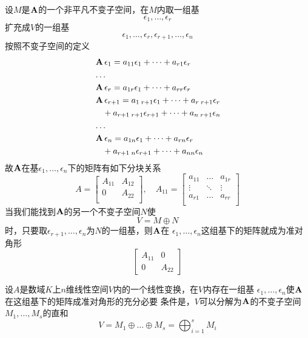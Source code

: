 \documentclass[11pt]{article}
\begin{document}
设\(M\)是\(\operatorname{\textbf{A}}\)的一个非平凡不变子空间，在\(M\)内取一组基
\begin{equation*}
\epsilon_1,\dots,\epsilon_r
\end{equation*}
扩充成\(V\)的一组基
\begin{equation*}
\epsilon_1,\dots,\epsilon_r,\epsilon_{r+1},\dots,\epsilon_n
\end{equation*}
按照不变子空间的定义
\begin{align*}
&\operatorname{\textbf{A}}\epsilon_1=a_{11}\epsilon_1+\dots+a_{r1}\epsilon_r\\
&\dots\\
&\operatorname{\textbf{A}}\epsilon_r=a_{1r}\epsilon_1+\dots+a_{rr}\epsilon_r\\
&\operatorname{\textbf{A}}\epsilon_{r+1}=a_{1\;r+1}\epsilon_1+\dots+a_{r\;r+1}\epsilon_r\\
&\quad+a_{r+1\;r+1}\epsilon_{r+1}+\dots+a_{n\;r+1}\epsilon_n\\
&\dots\\
&\operatorname{\textbf{A}}\epsilon_{n}=a_{1n}\epsilon_1+\dots+a_{rn}\epsilon_r\\
&\quad+a_{r+1\;n}\epsilon_{r+1}+\dots+a_{nn}\epsilon_n\\
\end{align*}
故\(\operatorname{\textbf{A}}\)在基\(\epsilon_1,\dots,\epsilon_n\)下的矩阵有如下分块关系
\begin{equation*}
A=
\begin{bmatrix}
A_{11}&A_{12}\\
0&A_{22}\\
\end{bmatrix},\quad
A_{11}=
\begin{bmatrix}
a_{11}&\dots&a_{1r}\\
\vdots&\ddots&\vdots\\
a_{r1}&\dots&a_{rr}\\
\end{bmatrix}
\end{equation*}
当我们能找到\(\operatorname{\textbf{A}}\)的另一个不变子空间\(N\)使
\begin{equation*}
V=M\oplus N
\end{equation*}
时，只要取\(\epsilon_{r+1},\dots,\epsilon_n\)为\(N\)的一组基，则\(\operatorname{\textbf{A}}\)在
\(\epsilon_1,\dots,\epsilon_n\)这组基下的矩阵就成为准对角形
\begin{equation*}
\begin{bmatrix}
A_{11}&0\\0&A_{22}
\end{bmatrix}
\end{equation*}

\begin{proposition}[]
设\(A\)是数域\(K\)上\(n\)维线性空间\(V\)内的一个线性变换，在\(V\)内存在一组基
\(\epsilon_1,\dots,\epsilon_n\)使\(\operatorname{\textbf{A}}\)在这组基下的矩阵成准对角形的充分必要
条件是，\(V\)可以分解为\(\operatorname{\textbf{A}}\)的不变子空间\(M_1,\dots,M_s\)的直和
\begin{equation*}
V=M_1\oplus \dots\oplus M_s=\bigoplus_{i=1}^s M_i
\end{equation*}
\end{proposition}
\end{document}
